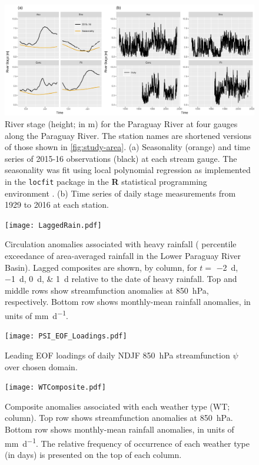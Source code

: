 \documentclass[twocol]{ametsoc}
\begin{document}
\begin{figure}
	\noindent\includegraphics[width=6.5in]{Streamflow.pdf}
	\caption{
		River stage (height; in \si{\meter}) for the Paraguay River at four gauges along the Paraguay River.
		The station names are shortened versions of those shown in \cref{fig:study-area}.
		(a) Seasonality (orange) and time series of 2015-16 observations (black) at each stream gauge.
			The seasonality was fit using local polynomial regression as implemented in the \texttt{locfit} package in
			the \textbf{R} statistical programming environment \citep{Loader1999}.
		(b) Time series of daily stage measurements from 1929 to 2016 at each station.
	}
  \label{fig:streamflow}
\end{figure}

\begin{figure}	\noindent\texttt{[image: LaggedRain.pdf]}
	\caption{
		Circulation anomalies associated with heavy rainfall ( percentile exceedance of area-averaged rainfall in the Lower Paraguay River Basin).
		Lagged composites are shown, by column, for $t = $ \SIlist{-2;-1;0;1}{\day} relative to the date of heavy rainfall.
		Top and middle rows show streamfunction anomalies at \SIlist{850}{\hecto\pascal}, respectively.
		Bottom row shows monthly-mean rainfall anomalies, in units of \si{\milli\meter\per\day}.
	}
  \label{fig:lagged-rain}
\end{figure}

\begin{figure}
	\noindent\texttt{[image: PSI\_EOF\_Loadings.pdf]}
	\caption{
    	Leading EOF loadings of daily NDJF \SI{850}{\hecto\pascal} streamfunction $\psi$ over chosen domain.
	}
  \label{fig:eof-loading}
\end{figure}

\begin{figure}
	\noindent\texttt{[image: WTComposite.pdf]}
	\caption{
		Composite anomalies associated with each weather type (WT; column).
		Top row shows streamfunction anomalies at \SIlist{850}{\hecto\pascal}.
		Bottom row shows monthly-mean rainfall anomalies, in units of \si{\milli\meter\per\day}. The relative frequency of occurrence of each weather type (in days) is presented on the top of each column.
	}
	\label{fig:wt-composite}
\end{figure}
\end{document}
